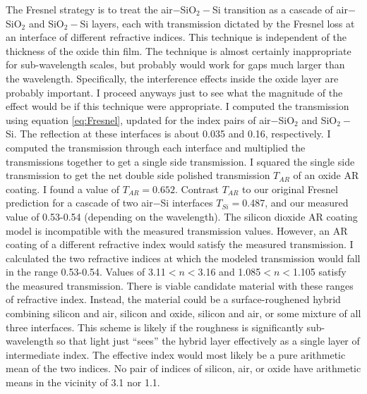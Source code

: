 The Fresnel strategy is to treat the air$-$SiO$_{2}-$Si transition as a cascade of air$-$SiO$_2$ and SiO$_{2}-$Si layers, each with transmission dictated by the Fresnel loss at an interface of different refractive indices.  This technique is independent of the thickness of the oxide thin film.  The technique is almost certainly inappropriate for sub-wavelength scales, but probably would work for gaps much larger than the wavelength.  Specifically, the interference effects inside the oxide layer are probably important.  I proceed anyways just to see what the magnitude of the effect would be if this technique were appropriate.  I computed the transmission using equation \ref{eq:Fresnel}, updated for the index pairs of air$-$SiO$_2$ and SiO$_{2}-$Si.  The reflection at these interfaces is about 0.035 and 0.16, respectively.  I computed the transmission through each interface and multiplied the transmissions together to get a single side transmission.  I squared the single side transmission to get the net double side polished transmission $T_{AR}$ of an oxide AR coating.  I found a value of $T_{AR}=0.652$.  Contrast $T_{AR}$ to our original Fresnel prediction for a cascade of two air$-$Si interfaces $T_{Si}=$0.487, and our measured value of 0.53-0.54 (depending on the wavelength).  The silicon dioxide AR coating model is incompatible with the measured transmission values.  However, an AR coating of a different refractive index would satisfy the measured transmission.  I calculated the two refractive indices at which the modeled transmission would fall in the range 0.53-0.54.  Values of  3.11$<n<$3.16 and 1.085$<n<$1.105 satisfy the measured transmission.  There is viable candidate material with these ranges of refractive index.  Instead, the material could be a surface-roughened hybrid combining silicon and air, silicon and oxide, silicon and air, or some mixture of all three interfaces.  This scheme is likely if the roughness is significantly sub-wavelength so that light just ``sees'' the hybrid layer effectively as a single layer of intermediate index.  The effective index would most likely be a pure arithmetic mean of the two indices.  No pair of indices of silicon, air, or oxide have arithmetic means in the vicinity of 3.1 nor 1.1.

